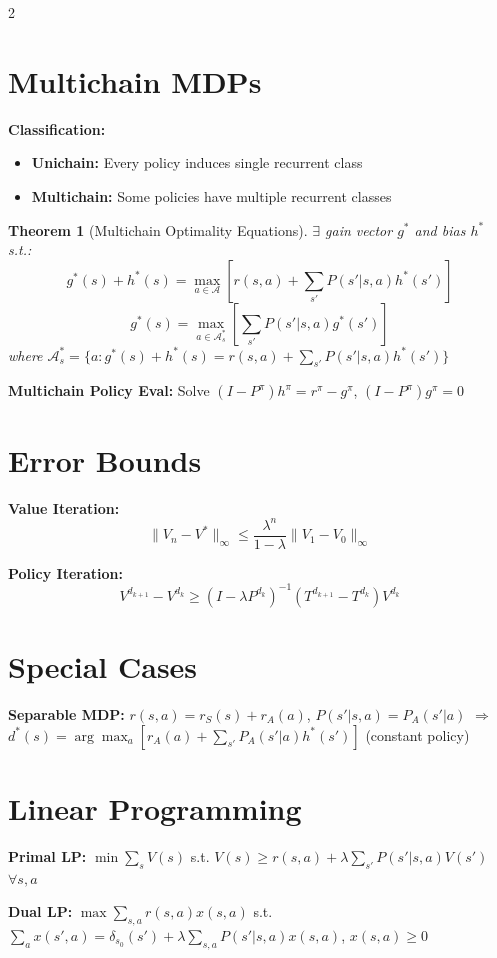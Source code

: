 \documentclass[8pt]{extarticle}
\newtheorem{theorem}{Theorem}
\begin{document}
\begin{multicols}{2}
\section*{\textcolor{theoremblue}{Multichain MDPs}}
\textbf{Classification:}
\begin{itemize}[leftmargin=*]
    \item \textbf{Unichain:} Every policy induces single recurrent class
    \item \textbf{Multichain:} Some policies have multiple recurrent classes
\end{itemize}

\begin{theorem}[Multichain Optimality Equations]
$\exists$ gain vector $g^*$ and bias $h^*$ s.t.:
$$g^*(s) + h^*(s) = \max_{a \in \mathcal{A}} \left[r(s,a) + \sum_{s'} P(s'|s,a) h^*(s')\right]$$
$$g^*(s) = \max_{a \in \mathcal{A}_s^*} \left[\sum_{s'} P(s'|s,a) g^*(s')\right]$$
where $\mathcal{A}_s^* = \{a: g^*(s) + h^*(s) = r(s,a) + \sum_{s'} P(s'|s,a) h^*(s')\}$
\end{theorem}

\textbf{Multichain Policy Eval:} Solve $(I-P^\pi)h^\pi = r^\pi - g^\pi$, $(I-P^\pi)g^\pi = 0$

\section*{\textcolor{proofpurple}{Error Bounds}}
\textbf{Value Iteration:}
$$\|V_n - V^*\|_\infty \leq \frac{\lambda^n}{1-\lambda} \|V_1 - V_0\|_\infty$$

\textbf{Policy Iteration:}
$$V^{d_{k+1}} - V^{d_k} \geq (I - \lambda P^{d_k})^{-1} (T^{d_{k+1}} - T^{d_k}) V^{d_k}$$

\section*{\textcolor{formulared}{Special Cases}}
\textbf{Separable MDP:} $r(s,a) = r_S(s) + r_A(a)$, $P(s'|s,a) = P_A(s'|a)$
$\Rightarrow$ $d^*(s) = \arg\max_a [r_A(a) + \sum_{s'} P_A(s'|a) h^*(s')]$ (constant policy)

\section*{\textcolor{formulared}{Linear Programming}}
\textbf{Primal LP:} $\min \sum_s V(s)$ s.t. $V(s) \geq r(s,a) + \lambda \sum_{s'} P(s'|s,a) V(s')$ $\forall s,a$

\textbf{Dual LP:} $\max \sum_{s,a} r(s,a) x(s,a)$ s.t. $\sum_a x(s',a) = \delta_{s_0}(s') + \lambda \sum_{s,a} P(s'|s,a) x(s,a)$, $x(s,a) \geq 0$


\end{multicols}
\end{document}
